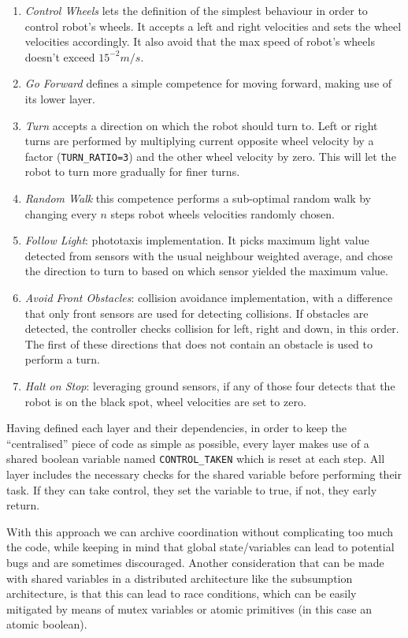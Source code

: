 \begin{enumerate}
	\item \emph{Control Wheels} lets the definition of the simplest behaviour
	      in order to control robot's wheels. It accepts a left and right
	      velocities and sets the wheel velocities accordingly. It also avoid
	      that the max speed of robot's wheels doesn't exceed $15^{-2}m/s$.
	\item \emph{Go Forward} defines a simple competence for moving forward,
	      making use of its lower layer.
	\item \emph{Turn} accepts a direction on which the robot should turn to.
	      Left or right turns are performed by multiplying current opposite wheel
	      velocity by a factor (\texttt{TURN\_RATIO=3}) and the other wheel velocity by zero.
	      This will let the robot to turn more gradually for finer turns.
	\item \emph{Random Walk} this competence performs a sub-optimal random walk by changing
	      every $n$ steps robot wheels velocities randomly chosen.
	\item \emph{Follow Light}: phototaxis implementation. It picks maximum
	      light value detected from sensors with the usual neighbour weighted
	      average, and chose the direction to turn to based on which sensor
	      yielded the maximum value.
	\item \emph{Avoid Front Obstacles}: collision avoidance implementation,
	      with a difference that only front sensors are used for detecting
	      collisions. If obstacles are detected, the controller checks collision
	      for left, right and down, in this order. The first of these directions
	      that does not contain an obstacle is used to perform a turn.
	\item \emph{Halt on Stop}: leveraging ground sensors, if any of those four
	      detects that the robot is on the black spot, wheel velocities are set
	      to zero.
\end{enumerate}
Having defined each layer and their dependencies, in order to keep the
``centralised'' piece of code as simple as possible, every layer makes use of a
shared boolean variable named \texttt{CONTROL\_TAKEN} which is reset at each
step. All layer includes the necessary checks for the shared variable before
performing their task. If they can take control, they set the variable to true,
if not, they early return.

With this approach we can archive coordination without complicating too much
the code, while keeping in mind that global state/variables can lead to
potential bugs and are sometimes discouraged. Another consideration that can be
made with shared variables in a distributed architecture like the subsumption
architecture, is that this can lead to race conditions, which can be easily
mitigated by means of mutex variables or atomic primitives (in this case an
atomic boolean).

